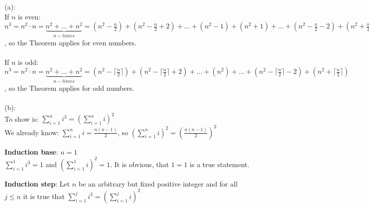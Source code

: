 \tasktodo

\label{ex:section1-2:8}
(a): \\
If $n$ is even: $n^3 = n^2\cdot n = \underbrace{n^2 + \ldots + n^2}_{n-times} = (n^2-\frac{n}{2}) + (n^2-\frac{n}{2}+2) + \ldots + (n^2-1) + (n^2+1) + \ldots + (n^2-\frac{n}{2}-2) + (n^2 + \frac{n}{2})$, so the Theorem applies for even numbers. \\ \\
If $n$ is odd: $n^3 = n^2\cdot n = \underbrace{n^2 + \ldots + n^2}_{n-times} = (n^2-\lceil\frac{n}{2}\rceil) + (n^2-\lceil\frac{n}{2}\rceil+2) + \ldots + (n^2) + \ldots + (n^2-\lceil\frac{n}{2}\rceil-2) + (n^2 + \lceil\frac{n}{2}\rceil)$, so the Theorem applies for odd numbers. \\ \\

(b): \\
To show is: $\sum_{i = 1}^n i^3 = \left(\sum_{i=1}^{n} i \right)^2$ \\
We already know: $\sum_{i=1}^{n} i = \frac{n(n-1)}{2}$, so $\left(\sum_{i=1}^{n} i \right)^2 = \left( \frac{n(n-1)}{2}\right)^2$

\textbf{Induction base}: $n = 1$ \\
$\sum_{i = 1}^1 i^3 = 1$ and $\left(\sum_{i = 1}^1 i\right)^2 = 1$.
It is obvious, that $1=1$ is a true statement.


\textbf{Induction step}: Let $n$ be an arbitrary but fixed positive integer and for all $j \leq n$ it is true that $\sum_{i = 1}^j i^3 = \left(\sum_{i=1}^{j} i \right)^2$

